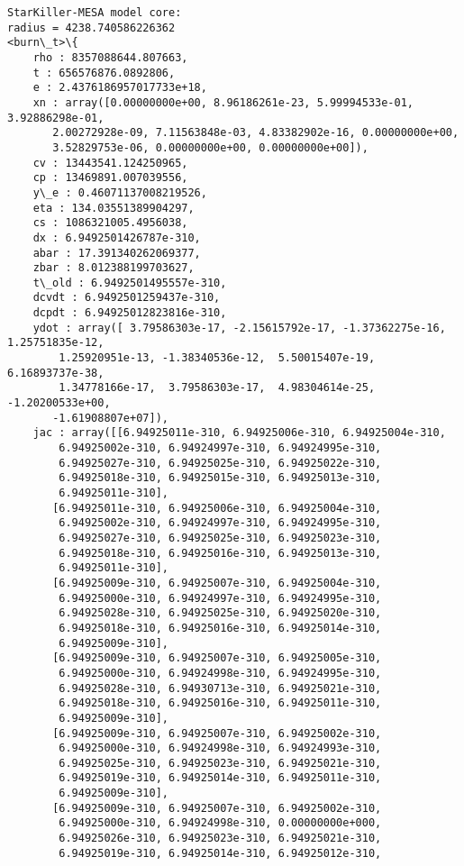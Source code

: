 \documentclass[11pt]{article}
\begin{document}
    \begin{Verbatim}[commandchars=\\\{\}]
StarKiller-MESA model core:
radius = 4238.740586226362
<burn\_t>\{
    rho : 8357088644.807663,
    t : 656576876.0892806,
    e : 2.4376186957017733e+18,
    xn : array([0.00000000e+00, 8.96186261e-23, 5.99994533e-01, 3.92886298e-01,
       2.00272928e-09, 7.11563848e-03, 4.83382902e-16, 0.00000000e+00,
       3.52829753e-06, 0.00000000e+00, 0.00000000e+00]),
    cv : 13443541.124250965,
    cp : 13469891.007039556,
    y\_e : 0.46071137008219526,
    eta : 134.03551389904297,
    cs : 1086321005.4956038,
    dx : 6.9492501426787e-310,
    abar : 17.391340262069377,
    zbar : 8.012388199703627,
    t\_old : 6.9492501495557e-310,
    dcvdt : 6.9492501259437e-310,
    dcpdt : 6.94925012823816e-310,
    ydot : array([ 3.79586303e-17, -2.15615792e-17, -1.37362275e-16,  1.25751835e-12,
        1.25920951e-13, -1.38340536e-12,  5.50015407e-19,  6.16893737e-38,
        1.34778166e-17,  3.79586303e-17,  4.98304614e-25, -1.20200533e+00,
       -1.61908807e+07]),
    jac : array([[6.94925011e-310, 6.94925006e-310, 6.94925004e-310,
        6.94925002e-310, 6.94924997e-310, 6.94924995e-310,
        6.94925027e-310, 6.94925025e-310, 6.94925022e-310,
        6.94925018e-310, 6.94925015e-310, 6.94925013e-310,
        6.94925011e-310],
       [6.94925011e-310, 6.94925006e-310, 6.94925004e-310,
        6.94925002e-310, 6.94924997e-310, 6.94924995e-310,
        6.94925027e-310, 6.94925025e-310, 6.94925023e-310,
        6.94925018e-310, 6.94925016e-310, 6.94925013e-310,
        6.94925011e-310],
       [6.94925009e-310, 6.94925007e-310, 6.94925004e-310,
        6.94925000e-310, 6.94924997e-310, 6.94924995e-310,
        6.94925028e-310, 6.94925025e-310, 6.94925020e-310,
        6.94925018e-310, 6.94925016e-310, 6.94925014e-310,
        6.94925009e-310],
       [6.94925009e-310, 6.94925007e-310, 6.94925005e-310,
        6.94925000e-310, 6.94924998e-310, 6.94924995e-310,
        6.94925028e-310, 6.94930713e-310, 6.94925021e-310,
        6.94925018e-310, 6.94925016e-310, 6.94925011e-310,
        6.94925009e-310],
       [6.94925009e-310, 6.94925007e-310, 6.94925002e-310,
        6.94925000e-310, 6.94924998e-310, 6.94924993e-310,
        6.94925025e-310, 6.94925023e-310, 6.94925021e-310,
        6.94925019e-310, 6.94925014e-310, 6.94925011e-310,
        6.94925009e-310],
       [6.94925009e-310, 6.94925007e-310, 6.94925002e-310,
        6.94925000e-310, 6.94924998e-310, 0.00000000e+000,
        6.94925026e-310, 6.94925023e-310, 6.94925021e-310,
        6.94925019e-310, 6.94925014e-310, 6.94925012e-310,

\end{Verbatim}
\end{document}
